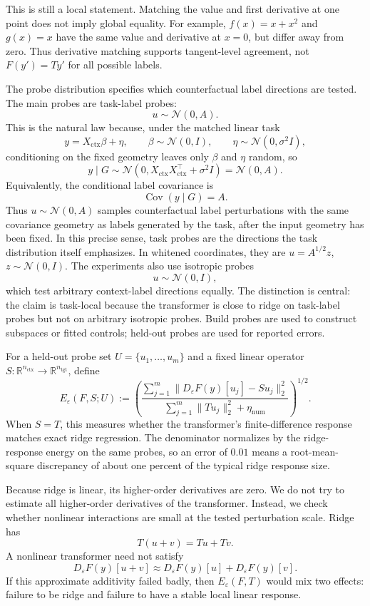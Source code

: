 \documentclass[11pt]{article}
\newcommand{\R}{\mathbb{R}}
\newcommand{\Cov}{\operatorname{Cov}}
\begin{document}
This is still a local statement. Matching the value and first derivative at one point does not imply
global equality. For example, \(f(x)=x+x^2\) and \(g(x)=x\) have the same value and derivative at
\(x=0\), but differ away from zero. Thus derivative matching supports tangent-level agreement,
not \(F(y')=Ty'\) for all possible labels.

The probe distribution specifies which counterfactual label directions are tested. The main probes
are task-label probes:
\[
u\sim\mathcal{N}(0,A).
\]
This is the natural law because, under the matched linear task
\[
y=X_{\mathrm{ctx}}\beta+\eta,\qquad
\beta\sim\mathcal{N}(0,I),\qquad
\eta\sim\mathcal{N}(0,\sigma^2I),
\]
conditioning on the fixed geometry leaves only \(\beta\) and \(\eta\) random, so
\[
y\mid G\sim\mathcal{N}(0,X_{\mathrm{ctx}}X_{\mathrm{ctx}}^\top+\sigma^2I)
=\mathcal{N}(0,A).
\]
Equivalently, the conditional label covariance is
\[
\Cov(y\mid G)=A.
\]
Thus \(u\sim\mathcal{N}(0,A)\) samples counterfactual label perturbations with the same covariance
geometry as labels generated by the task, after the input geometry has been fixed. In this precise
sense, task probes are the directions the task distribution itself emphasizes. In whitened coordinates,
they are \(u=A^{1/2}z\), \(z\sim\mathcal{N}(0,I)\). The experiments also use isotropic probes
\[
u\sim\mathcal{N}(0,I),
\]
which test arbitrary context-label directions equally. The distinction is central: the claim is
task-local because the transformer is close to ridge on task-label probes but not on arbitrary
isotropic probes. Build probes are used to construct subspaces or fitted controls; held-out probes
are used for reported errors.

For a held-out probe set \(U=\{u_1,\ldots,u_m\}\) and a fixed linear operator
\(S:\R^{n_{\mathrm{ctx}}}\to\R^{n_{\mathrm{tgt}}}\), define
\[
E_\varepsilon(F,S;U)
:=
\left(
\frac{
\sum_{j=1}^m\|D_\varepsilon F(y)[u_j]-Su_j\|_2^2
}{
\sum_{j=1}^m\|Tu_j\|_2^2+\eta_{\mathrm{num}}
}
\right)^{1/2}.
\]
When \(S=T\), this measures whether the transformer's finite-difference response matches exact
ridge regression. The denominator normalizes by the ridge-response energy on the same probes, so
an error of \(0.01\) means a root-mean-square discrepancy of about one percent of the typical ridge
response size.

Because ridge is linear, its higher-order derivatives are zero. We do not try to estimate all
higher-order derivatives of the transformer. Instead, we check whether nonlinear interactions are
small at the tested perturbation scale. Ridge has
\[
T(u+v)=Tu+Tv.
\]
A nonlinear transformer need not satisfy
\[
D_\varepsilon F(y)[u+v]\approx D_\varepsilon F(y)[u]+D_\varepsilon F(y)[v].
\]
If this approximate additivity failed badly, then \(E_\varepsilon(F,T)\) would mix two effects:
failure to be ridge and failure to have a stable local linear response.
\end{document}
